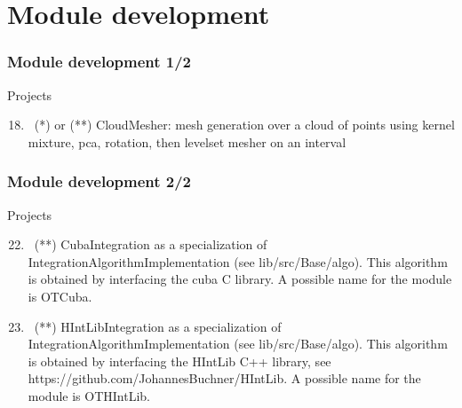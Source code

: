 \documentclass[8pt]{beamer}
\begin{document}
\section{Module development}

\begin{frame}
  \frametitle{Module development 1/2}
  \begin{block}{Projects}
    \begin{enumerate}
      \setcounter{enumi}{17}
    \item~(*) or (**) \alert{\ttfamily CloudMesher}: mesh generation over a cloud of points using kernel mixture, pca, rotation, then levelset mesher on an interval
    \end{enumerate}
  \end{block}
\end{frame}

\begin{frame}
  \frametitle{Module development 2/2}
  \begin{block}{Projects}
    \begin{enumerate}
      \setcounter{enumi}{21}
    \item~(**) \alert{\ttfamily CubaIntegration} as a specialization of {\ttfamily IntegrationAlgorithmImplementation} (see {\ttfamily lib/src/Base/algo}). This algorithm is obtained by interfacing the cuba C library. A possible name for the module is \alert{OTCuba}.
    \item~(**) \alert{\ttfamily HIntLibIntegration} as a specialization of {\ttfamily IntegrationAlgorithmImplementation} (see {\ttfamily lib/src/Base/algo}). This algorithm is obtained by interfacing the HIntLib C++ library, see \alert{https://github.com/JohannesBuchner/HIntLib}. A possible name for the module is \alert{OTHIntLib}.
    \end{enumerate}
  \end{block}
\end{frame}
\end{document}
